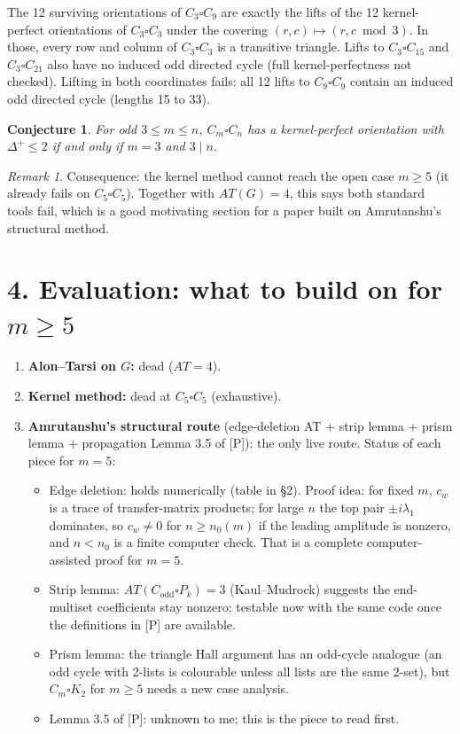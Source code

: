 \documentclass[11pt]{article}
\newtheorem{conjecture}{Conjecture}
\theoremstyle{remark}\newtheorem*{remark}{Remark}
\begin{document}
The 12 surviving orientations of $C_3\square C_9$ are exactly the lifts of the 12
kernel-perfect orientations of $C_3\square C_3$ under the covering
$(r,c)\mapsto(r,c\bmod 3)$. In those, every row and column of $C_3\square C_3$ is a
transitive triangle. Lifts to $C_3\square C_{15}$ and $C_3\square C_{21}$ also have no
induced odd directed cycle (full kernel-perfectness not checked). Lifting in both
coordinates fails: all 12 lifts to $C_9\square C_9$ contain an induced odd directed
cycle (lengths 15 to 33).

\begin{conjecture}
For odd $3\le m\le n$, $C_m\square C_n$ has a kernel-perfect orientation with
$\Delta^+\le2$ if and only if $m=3$ and $3\mid n$.
\end{conjecture}

\begin{remark}
Consequence: the kernel method cannot reach the open case $m\ge5$ (it already fails on
$C_5\square C_5$). Together with $AT(G)=4$, this says both standard tools fail, which
is a good motivating section for a paper built on Amrutanshu's structural method.
\end{remark}

\section*{4. Evaluation: what to build on for $m\ge 5$}
\begin{enumerate}[leftmargin=1.5em]
\item \textbf{Alon--Tarsi on $G$:} dead ($AT=4$).
\item \textbf{Kernel method:} dead at $C_5\square C_5$ (exhaustive).
\item \textbf{Amrutanshu's structural route} (edge-deletion AT + strip lemma + prism
lemma + propagation Lemma 3.5 of [P]): the only live route. Status of each piece for $m=5$:
\begin{itemize}[nosep]
\item Edge deletion: holds numerically (table in \S2). Proof idea: for fixed $m$,
$c_w$ is a trace of transfer-matrix products; for large $n$ the top pair $\pm i\lambda_1$
dominates, so $c_w\neq0$ for $n\ge n_0(m)$ if the leading amplitude is nonzero, and
$n<n_0$ is a finite computer check. That is a complete computer-assisted proof for
$m=5$.
\item Strip lemma: $AT(C_{\text{odd}}\square P_k)=3$ (Kaul--Mudrock) suggests the
end-multiset coefficients stay nonzero; testable now with the same code once the
definitions in [P] are available.
\item Prism lemma: the triangle Hall argument has an odd-cycle analogue (an odd
cycle with 2-lists is colourable unless all lists are the same 2-set), but
$C_m\square K_2$ for $m\ge5$ needs a new case analysis.
\item Lemma 3.5 of [P]: unknown to me; this is the piece to read first.
\end{itemize}
\end{enumerate}
\end{document}
